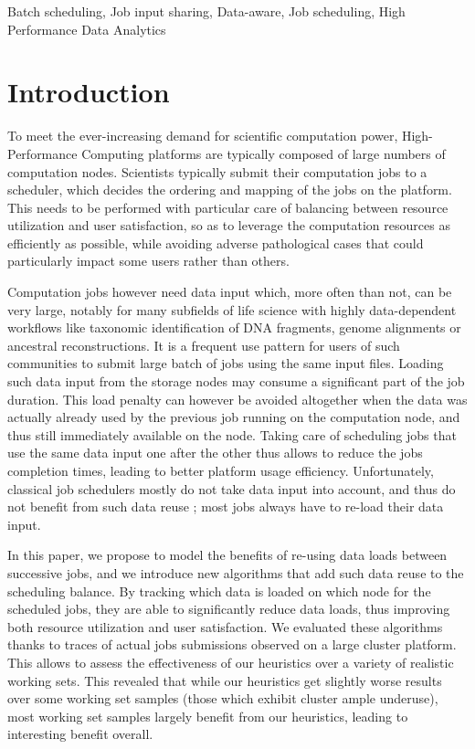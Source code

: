 \documentclass[conference]{IEEEtran}
\begin{document}
\begin{IEEEkeywords}
Batch scheduling,
Job input sharing,
Data-aware,
Job scheduling,
High Performance Data Analytics
\end{IEEEkeywords}

\section{Introduction}\label{sec.introduction}

To meet the ever-increasing demand for scientific computation power,
High-Performance Computing platforms are typically composed of large
numbers of computation nodes. Scientists typically submit their
computation jobs to a scheduler, which decides the ordering and mapping
of the jobs on the platform. This needs to be performed with particular
care of balancing between resource utilization and user satisfaction, so
as to leverage the computation resources as efficiently as possible,
while avoiding adverse pathological cases that could particularly impact
some users rather than others.

Computation jobs however need data input which, more often than not, can
be very large, notably for many subfields of life science with highly
data-dependent workflows like taxonomic identification of DNA fragments, genome alignments or ancestral reconstructions. It is a frequent use pattern for users of such communities to submit
large batch of jobs using the same input files.
Loading such data input from the storage
nodes may consume a significant part of the job duration. This load
penalty can however be avoided altogether when the data was actually
already used by the previous job running on the computation node, and
thus still immediately available on the node. Taking care of scheduling
jobs that use the same data input one after the other thus allows to
reduce the jobs completion times, leading to better platform usage
efficiency. Unfortunately, classical job schedulers mostly do not take
data input into account, and thus do not benefit from such data reuse ;
most jobs always have to re-load their data input.

In this paper, we propose to model the benefits of re-using data loads
between successive jobs, and we introduce new algorithms that add such
data reuse to the scheduling balance. By tracking which data is loaded
on which node for the scheduled jobs, they are able to significantly
reduce data loads, thus improving both resource utilization and user
satisfaction. We evaluated these algorithms thanks to traces of actual
jobs submissions observed on a large cluster platform. This allows to
assess the effectiveness of our heuristics over a variety of realistic
working sets. This revealed that while our heuristics get slightly worse
results over some working set samples (those which exhibit cluster ample
underuse), most working set samples largely benefit from our heuristics,
leading to interesting benefit overall.
\end{document}
